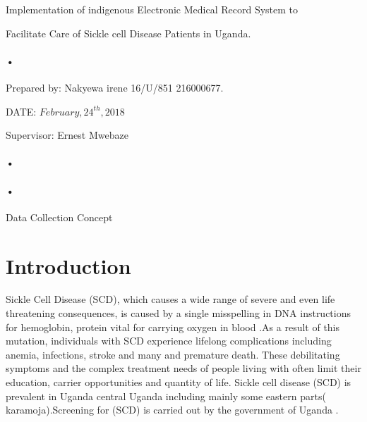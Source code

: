 \documentclass[12pt,]{article}
\begin{document}
\begin{titlepage}
\centerline{Implementation of indigenous Electronic Medical Record System to\\}
\centerline{ Facilitate Care of Sickle cell Disease Patients in Uganda.\\}
\paragraph*{•}
\centerline{  Prepared by:  Nakyewa irene 16/U/851 216000677.\\}
\centerline{DATE: $February,24^{th},2018$\\}
\centerline{Supervisor: Ernest Mwebaze\\}

\paragraph*{•}
\paragraph*{•}
  \centerline{Data Collection Concept}
\date{\today}
\end{titlepage}

\newpage



\section{Introduction}
Sickle Cell Disease
(SCD), which causes a wide range of severe and even life threatening consequences, is caused by a single misspelling in DNA instructions for hemoglobin, protein vital  for carrying  oxygen in blood .As a result of this mutation, individuals with SCD experience lifelong complications including anemia, infections, stroke and many and premature death. These debilitating symptoms and the complex treatment needs of people living with often limit their education, carrier opportunities and quantity of life. Sickle cell disease (SCD) is prevalent in Uganda central Uganda including mainly some eastern parts( karamoja).Screening for (SCD) is carried out by the government of Uganda . 
\end{document}
